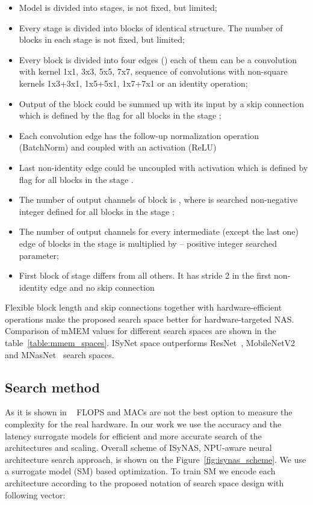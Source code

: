 \documentclass[letterpaper]{article}
\begin{document}
\begin{itemize}
\item Model is divided into  stages,  is not fixed, but limited;
\item Every stage  is divided into blocks  of identical structure. The number of blocks  in each stage is not fixed, but limited;
\item Every block  is divided into four edges () each of them can be a convolution with kernel 1x1, 3x3, 5x5, 7x7, sequence of convolutions with non-square kernels 1x3+3x1, 1x5+5x1, 1x7+7x1 or an identity operation;
\item Output of the block could be summed up with its input by a skip connection which is defined by the flag  for all blocks in the stage ;
\item Each convolution edge has the follow-up normalization operation (BatchNorm) and coupled with an activation (ReLU)
\item Last non-identity edge could be uncoupled with activation which is defined by flag  for all blocks in the stage .
\item The number of output channels of block  is , where  is searched non-negative integer defined for all blocks in the stage ;
\item The number of output channels for every intermediate (except the last one) edge of blocks in the stage  is multiplied by  – positive integer searched parameter;
\item First block of stage differs from all others. It has stride 2 in the first non-identity edge and no skip connection
\end{itemize}

Flexible block length and skip connections together with hardware-efficient operations make the proposed search space better for hardware-targeted NAS.
Comparison of mMEM values for different search spaces are shown in the table~\ref{table:mmem_spaces}.
ISyNet space outperforms ResNet~\cite{he2015deep}, MobileNetV2~\cite{sandler2019mobilenetv2} and MNasNet~\cite{tan2019mnasnet} search spaces.

\subsection{Search method}

As it is shown in ~\cite{radosavovic2020designing,gupta2020acceleratoraware} FLOPS and MACs are not the best option to measure the complexity for the real hardware. In our work we use the accuracy and the latency surrogate models for efficient and more accurate search of the architectures and scaling. Overall scheme of ISyNAS, NPU-aware neural architecture search approach, is shown on the Figure~\ref{fig:isynas_scheme}. We use a surrogate model (SM) based optimization. To train SM we encode each architecture according to the proposed notation of search space design with following vector:
\end{document}
